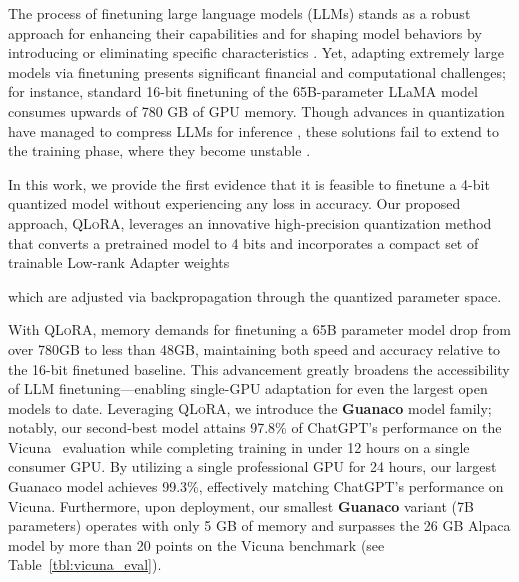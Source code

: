 The process of finetuning large language models (LLMs) stands as a robust approach for enhancing their capabilities \citep{min2021metaicl, wei2021finetuned, ouyang2022training, wang2022super, wang2022self, liu2022few} and for shaping model behaviors by introducing or eliminating specific characteristics \citep{ouyang2022training,askell2021general,bai2022training}. Yet, adapting extremely large models via finetuning presents significant financial and computational challenges; for instance, standard 16-bit finetuning of the 65B-parameter LLaMA model~\citep{touvron2023llama} consumes upwards of 780 GB of GPU memory. Though advances in quantization have managed to compress LLMs for inference \citep{dettmers2022llm, dettmers2022case, frantar2022gptq, xiao2022smoothquant}, these solutions fail to extend to the training phase, where they become unstable \citep{wortsman2023stable}.

In this work, we provide the first evidence that it is feasible to finetune a 4-bit quantized model without experiencing any loss in accuracy. Our proposed approach, \textsc{QLoRA}, leverages an innovative high-precision quantization method that converts a pretrained model to 4 bits and incorporates a compact set of trainable Low-rank Adapter weights \citep{hu2021lora}

which are adjusted via backpropagation through the quantized parameter space.

With \textsc{QLoRA}, memory demands for finetuning a 65B parameter model drop from over 780GB to less than 48GB, maintaining both speed and accuracy relative to the 16-bit finetuned baseline. This advancement greatly broadens the accessibility of LLM finetuning—enabling single-GPU adaptation for even the largest open models to date. Leveraging \textsc{QLoRA}, we introduce the \textbf{Guanaco} model family; notably, our second-best model attains 97.8\% of ChatGPT's performance on the Vicuna~\citep{vicuna2023} evaluation while completing training in under 12 hours on a single consumer GPU. By utilizing a single professional GPU for 24 hours, our largest Guanaco model achieves 99.3\%, effectively matching ChatGPT’s performance on Vicuna. Furthermore, upon deployment, our smallest \textbf{Guanaco} variant (7B parameters) operates with only 5 GB of memory and surpasses the 26 GB Alpaca model by more than 20 points on the Vicuna benchmark (see Table~\ref{tbl:vicuna_eval}).

